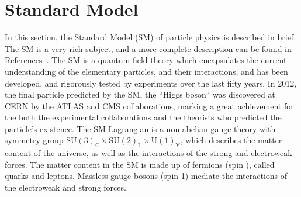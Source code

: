\FloatBarrier
\section{Standard Model}
\label{sec:sm}

In this section, the Standard Model (SM) of particle physics is described in
brief.
The SM is a very rich subject, and a more complete description can be found in
References~\cite{Agashe:2014kda,opac-b1131978,halzen1984quarks}.
The SM is a quantum field theory which encapsulates the current understanding
of the elementary particles, and their interactions, and has been developed,
and rigorously tested by experiments over the last fifty years.
In 2012, the final particle predicted by the SM, the ``Higgs boson`` was
discovered at CERN by the ATLAS and CMS collaborations, marking a great
achievement for the both the experimental collaborations and the theorists
who predicted the particle's existence.
The SM Lagrangian is a non-abelian gauge theory with symmetry group 
$\mathrm{SU}(3)_\mathrm{C} \times
\mathrm{SU}(2)_\mathrm{L} \times
\mathrm{U}(1)_\mathrm{Y}$,
which describes the matter content of the universe, as well as the interactions
of the strong and electroweak forces.
The matter content in the SM is made up of fermions (spin ),
called quarks and leptons.
Massless gauge bosons (spin 1) mediate the interactions of the electroweak and
strong forces.

\begin{figure}[ht]
\end{figure}

